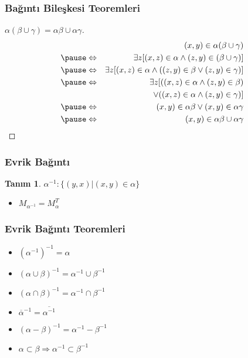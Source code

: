 \documentclass[dvipsnames]{beamer}
\theoremstyle{definition}
\newtheorem{tanim}[theorem]{Tanım}
\theoremstyle{example}
\theoremstyle{plain}
\begin{document}
\begin{frame}
  \frametitle{Bağıntı Bileşkesi Teoremleri}

  \begin{proof}[$\alpha (\beta \cup \gamma) = \alpha \beta \cup \alpha \gamma$]
    \begin{eqnarray*}
      &                 & (x,y) \in \alpha (\beta \cup \gamma)\\\pause
      & \Leftrightarrow & \exists z [(x,z) \in \alpha
                              \wedge (z,y) \in (\beta \cup \gamma)]\\\pause
      & \Leftrightarrow & \exists z [(x,z) \in \alpha
                             \wedge ((z,y) \in \beta
                                \vee (z,y) \in \gamma)]\\\pause
      & \Leftrightarrow & \exists z [((x,z) \in \alpha \wedge (z,y) \in \beta)\\
      &                 &     ~~\vee ((x,z) \in \alpha \wedge (z,y) \in \gamma)]\\\pause
      & \Leftrightarrow & (x,y) \in \alpha \beta \vee (x,y) \in \alpha \gamma\\\pause
      & \Leftrightarrow & (x,y) \in \alpha \beta \cup \alpha \gamma
    \end{eqnarray*}
  \end{proof}
\end{frame}

\begin{frame}
  \frametitle{Evrik Bağıntı}

  \begin{tanim}
    $\alpha^{-1}: \{(y,x) | (x,y) \in \alpha \}$
  \end{tanim}

  \pause
  \begin{itemize}
    \item $M_{\alpha^{-1}} = M_{\alpha}^T$
  \end{itemize}
\end{frame}

\begin{frame}
  \frametitle{Evrik Bağıntı Teoremleri}

  \begin{itemize}
    \item $(\alpha^{-1})^{-1} = \alpha$

    \pause
    \item $(\alpha \cup \beta)^{-1} = \alpha^{-1} \cup \beta^{-1}$

    \pause
    \item $(\alpha \cap \beta)^{-1} = \alpha^{-1} \cap \beta^{-1}$

    \pause
    \item $\overline{\alpha}^{-1} = \overline{\alpha^{-1}}$

    \pause
    \item $(\alpha - \beta)^{-1} = \alpha^{-1} - \beta^{-1}$

    \pause
    \item $\alpha \subset \beta \Rightarrow \alpha^{-1} \subset \beta^{-1}$
  \end{itemize}
\end{frame}
\end{document}
